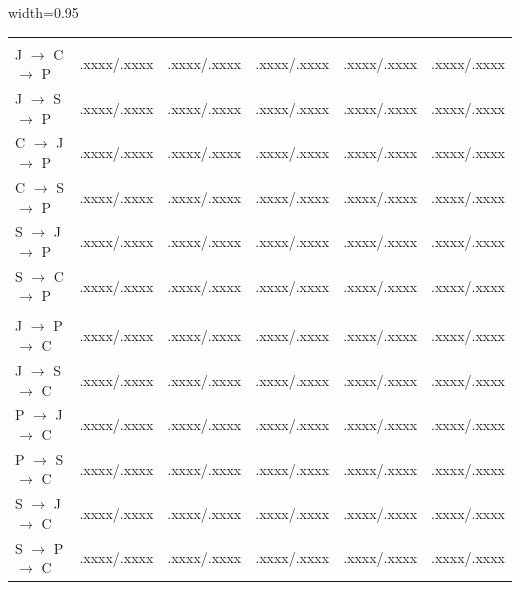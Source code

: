 \documentclass[final,5p,times,twocolumn]{elsarticle}
\theoremstyle{plain}
\begin{document}
\begin{table}[!htbp]
\begin{adjustbox}{width=0.95\columnwidth}
\begin{tabular}{@{}lccccc@{}}
\addlinespace[1pt]
\rowcolor{black!7}
\multicolumn{6}{@{}l}{\textit{Target Python (P)}} \\

J $\rightarrow$ C $\rightarrow$ P
& .xxxx/.xxxx & .xxxx/.xxxx & .xxxx/.xxxx & .xxxx/.xxxx & .xxxx/.xxxx \\
J $\rightarrow$ S $\rightarrow$ P
& .xxxx/.xxxx & .xxxx/.xxxx & .xxxx/.xxxx & .xxxx/.xxxx & .xxxx/.xxxx \\
C $\rightarrow$ J $\rightarrow$ P
& .xxxx/.xxxx & .xxxx/.xxxx & .xxxx/.xxxx & .xxxx/.xxxx & .xxxx/.xxxx \\
C $\rightarrow$ S $\rightarrow$ P
& .xxxx/.xxxx & .xxxx/.xxxx & .xxxx/.xxxx & .xxxx/.xxxx & .xxxx/.xxxx \\
S $\rightarrow$ J $\rightarrow$ P
& .xxxx/.xxxx & .xxxx/.xxxx & .xxxx/.xxxx & .xxxx/.xxxx & .xxxx/.xxxx \\
S $\rightarrow$ C $\rightarrow$ P
& .xxxx/.xxxx & .xxxx/.xxxx & .xxxx/.xxxx & .xxxx/.xxxx & .xxxx/.xxxx \\

\addlinespace[1pt]
\rowcolor{black!7}
\multicolumn{6}{@{}l}{\textit{Target C++ (C)}} \\

J $\rightarrow$ P $\rightarrow$ C
& .xxxx/.xxxx & .xxxx/.xxxx & .xxxx/.xxxx & .xxxx/.xxxx & .xxxx/.xxxx \\
J $\rightarrow$ S $\rightarrow$ C
& .xxxx/.xxxx & .xxxx/.xxxx & .xxxx/.xxxx & .xxxx/.xxxx & .xxxx/.xxxx \\
P $\rightarrow$ J $\rightarrow$ C
& .xxxx/.xxxx & .xxxx/.xxxx & .xxxx/.xxxx & .xxxx/.xxxx & .xxxx/.xxxx \\
P $\rightarrow$ S $\rightarrow$ C
& .xxxx/.xxxx & .xxxx/.xxxx & .xxxx/.xxxx & .xxxx/.xxxx & .xxxx/.xxxx \\
S $\rightarrow$ J $\rightarrow$ C
& .xxxx/.xxxx & .xxxx/.xxxx & .xxxx/.xxxx & .xxxx/.xxxx & .xxxx/.xxxx \\
S $\rightarrow$ P $\rightarrow$ C
& .xxxx/.xxxx & .xxxx/.xxxx & .xxxx/.xxxx & .xxxx/.xxxx & .xxxx/.xxxx \\

\bottomrule
\end{tabular}
\end{adjustbox}
\end{table}
\end{document}
